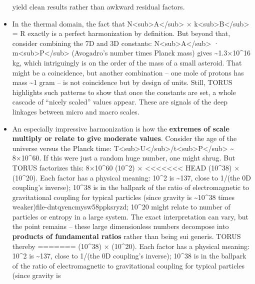 \documentclass[]{article}
\begin{document}
\begin{itemize}
  yield clean results rather than awkward residual factors.
\item
  In the thermal domain, the fact that
  N\textless{}sub\textgreater{}A\textless{}/sub\textgreater{} ×
  k\textless{}sub\textgreater{}B\textless{}/sub\textgreater{} = R
  exactly is a perfect harmonization by definition. But beyond that,
  consider combining the 7D and 3D constants:
  N\textless{}sub\textgreater{}A\textless{}/sub\textgreater{} ·
  m\textless{}sub\textgreater{}P\textless{}/sub\textgreater{}
  (Avogadro's number times Planck mass) gives
  \textasciitilde{}1.3×10\^{}16 kg​, which intriguingly is on the order
  of the mass of a small asteroid. That might be a coincidence, but
  another combination -- one mole of protons has mass \textasciitilde{}1
  gram -- is not coincidence but by design of units. Still, TORUS
  highlights such patterns to show that once the constants are set, a
  whole cascade of ``nicely scaled'' values appear. These are signals of
  the deep linkages between micro and macro scales.
\item
  An especially impressive harmonization is how the \textbf{extremes of
  scale multiply or relate to give moderate values}. Consider the age of
  the universe versus the Planck time:
  T\textless{}sub\textgreater{}U\textless{}/sub\textgreater{}/t\textless{}sub\textgreater{}P\textless{}/sub\textgreater{}
  \textasciitilde{} 8×10\^{}60. If this were just a random huge number,
  one might shrug. But TORUS factorizes this: 8×10\^{}60 \approx (10\^{}2) ×
<<<<<<< HEAD
  (10\^{}38) × (10\^{}20)\hspace{0pt}. Each factor has a physical
  meaning: 10\^{}2 is \textasciitilde137, close to 1/\alpha (the 0D
  coupling's inverse)\hspace{0pt}; 10\^{}38 is in the ballpark of the
  ratio of electromagnetic to gravitational coupling for typical
  particles (since gravity is \textasciitilde10\^{}38 times
  weaker)\hspace{0pt}file-dntqyencmysw58ppksryzd; 10\^{}20 might relate
  to number of particles or entropy in a large system. The exact
  interpretation can vary, but the point remains -- these large
  dimensionless numbers decompose into \textbf{products of fundamental
  ratios} rather than being sui generis. TORUS thereby
=======
  (10\^{}38) × (10\^{}20)​. Each factor has a physical meaning: 10\^{}2
  is \textasciitilde{}137, close to 1/\alpha (the 0D coupling's inverse)​;
  10\^{}38 is in the ballpark of the ratio of electromagnetic to
  gravitational coupling for typical particles (since gravity is

\end{itemize}
\end{document}
